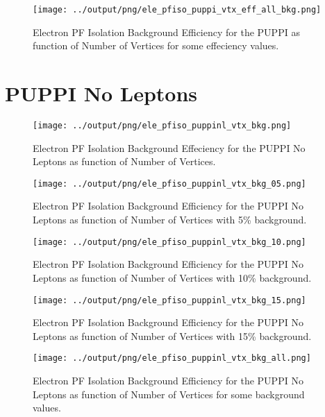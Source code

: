 \documentclass[11pt]{book}
\begin{document}
\begin{figure}[htb]
\centering
\texttt{[image: ../output/png/ele\_pfiso\_puppi\_vtx\_eff\_all\_bkg.png]}
\caption{Electron PF Isolation Background Efficiency for the PUPPI as function of Number of Vertices for some effeciency values.}
\label{fig:ele_pfiso_vtx_eff_puppi_eff_all_bkg}
\end{figure}
\clearpage

\section{PUPPI No Leptons}
\begin{figure}[htb]
\centering
\texttt{[image: ../output/png/ele\_pfiso\_puppinl\_vtx\_bkg.png]}
\caption{Electron PF Isolation Background Effeciency for the PUPPI No Leptons as function of Number of Vertices.}
\label{fig:ele_pfiso_vtx_bkg_puppinl}
\end{figure}

\begin{figure}[htb]
\centering
\texttt{[image: ../output/png/ele\_pfiso\_puppinl\_vtx\_bkg\_05.png]}
\caption{Electron PF Isolation Background Efficiency for the PUPPI No Leptons as function of Number of Vertices with 5\% background.}
\label{fig:ele_pfiso_vtx_bkg_puppinl_bkg_05}
\end{figure}

\begin{figure}[htb]
\centering
\texttt{[image: ../output/png/ele\_pfiso\_puppinl\_vtx\_bkg\_10.png]}
\caption{Electron PF Isolation Background Efficiency for the PUPPI No Leptons as function of Number of Vertices with 10\% background.}
\label{fig:ele_pfiso_vtx_bkg_puppinl_bkg_10}
\end{figure}

\begin{figure}[htb]
\centering
\texttt{[image: ../output/png/ele\_pfiso\_puppinl\_vtx\_bkg\_15.png]}
\caption{Electron PF Isolation Background Efficiency for the PUPPI No Leptons as function of Number of Vertices with 15\% background.}
\label{fig:ele_pfiso_vtx_bkg_puppinl_bkg_15}
\end{figure}

\begin{figure}[htb]
\centering
\texttt{[image: ../output/png/ele\_pfiso\_puppinl\_vtx\_bkg\_all.png]}
\caption{Electron PF Isolation Background Efficiency for the PUPPI No Leptons as function of Number of Vertices for some background values.}
\label{fig:ele_pfiso_vtx_bkg_puppinl_bkg_all}
\end{figure}
\end{document}
